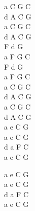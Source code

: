 \documentclass[a5paper, 10pt]{book}
\begin{document}
\begin{minipage}[t]{0.3\textwidth}
  a C G C\\
  d A C G\\
  a C G C\\
  d A C G\\

  F d G \\
  a F G C\\
  F d G \\
  a F G C\\

  a C G C\\
  d A C G\\
  a C G C\\
  d A C G\\


  a e C G\\
  a e C G\\
  d a F C\\
  a e C G\vspace*{2mm}

  a e C G\\
  a e C G\\
  d a F C\\
  a e C G\\
\end{minipage}

\newpage
\end{document}
